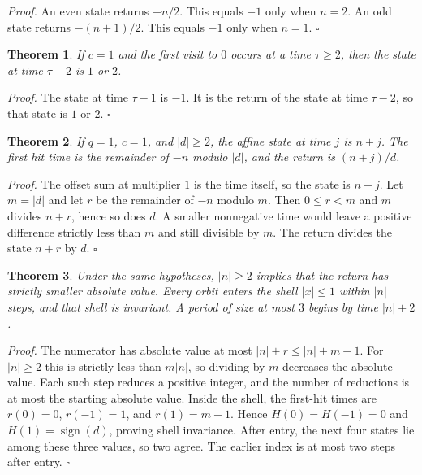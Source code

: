 \documentclass[11pt,letterpaper]{article}
\newtheorem{theorem}{Theorem}
\newenvironment{proof}{\noindent\textit{Proof.}}{\hfill\(\square\)}
\begin{document}
\begin{proof}
An even state returns \(-n/2\). This equals \(-1\) only when \(n=2\). An odd state returns \(-(n+1)/2\). This equals \(-1\) only when \(n=1\).
\end{proof}

\begin{theorem}
\label{thm:negtwotwobefore}
If \(c=1\) and the first visit to \(0\) occurs at a time \(\tau\ge 2\), then the state at time \(\tau-2\) is \(1\) or \(2\).
\end{theorem}

\begin{proof}
The state at time \(\tau-1\) is \(-1\). It is the return of the state at time \(\tau-2\), so that state is \(1\) or \(2\).
\end{proof}

\begin{theorem}
\label{thm:oneoffset}
If \(q=1\), \(c=1\), and \(\lvert d\rvert\ge 2\), the affine state at time \(j\) is \(n+j\). The first hit time is the remainder of \(-n\) modulo \(\lvert d\rvert\), and the return is \((n+j)/d\).
\end{theorem}

\begin{proof}
The offset sum at multiplier \(1\) is the time itself, so the state is \(n+j\). Let \(m=\lvert d\rvert\) and let \(r\) be the remainder of \(-n\) modulo \(m\). Then \(0\le r<m\) and \(m\) divides \(n+r\), hence so does \(d\). A smaller nonnegative time would leave a positive difference strictly less than \(m\) and still divisible by \(m\). The return divides the state \(n+r\) by \(d\).
\end{proof}

\begin{theorem}
\label{thm:oneoffsetdrop}
Under the same hypotheses, \(\lvert n\rvert\ge 2\) implies that the return has strictly smaller absolute value. Every orbit enters the shell \(\lvert x\rvert\le 1\) within \(\lvert n\rvert\) steps, and that shell is invariant. A period of size at most \(3\) begins by time \(\lvert n\rvert+2\).
\end{theorem}

\begin{proof}
The numerator has absolute value at most \(\lvert n\rvert+r\le\lvert n\rvert+m-1\). For \(\lvert n\rvert\ge 2\) this is strictly less than \(m\lvert n\rvert\), so dividing by \(m\) decreases the absolute value. Each such step reduces a positive integer, and the number of reductions is at most the starting absolute value. Inside the shell, the first-hit times are \(r(0)=0\), \(r(-1)=1\), and \(r(1)=m-1\). Hence \(H(0)=H(-1)=0\) and \(H(1)=\operatorname{sign}(d)\), proving shell invariance. After entry, the next four states lie among these three values, so two agree. The earlier index is at most two steps after entry.
\end{proof}
\end{document}
